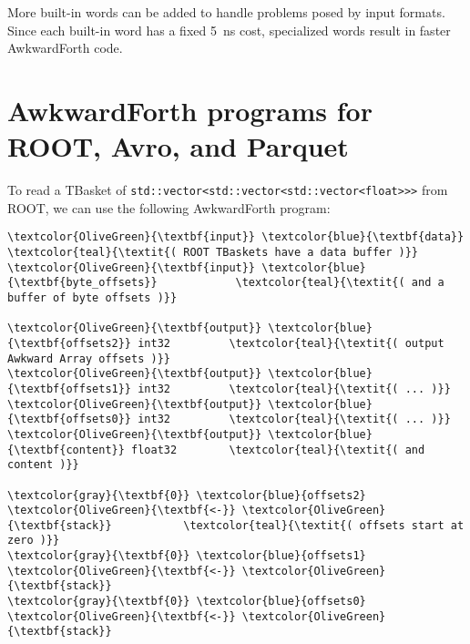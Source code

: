 \documentclass{webofc}
\begin{document}
More built-in words can be added to handle problems posed by input formats. Since each built-in word has a fixed 5~ns cost, specialized words result in faster AwkwardForth code.

\section{AwkwardForth programs for ROOT, Avro, and Parquet}

To read a TBasket of \texttt{std::vector<std::vector<std::vector<float>>>} from ROOT, we can use the following AwkwardForth program:

\begin{Verbatim}[commandchars=\\\{\}]
\textcolor{OliveGreen}{\textbf{input}} \textcolor{blue}{\textbf{data}}                    \textcolor{teal}{\textit{( ROOT TBaskets have a data buffer )}}
\textcolor{OliveGreen}{\textbf{input}} \textcolor{blue}{\textbf{byte_offsets}}            \textcolor{teal}{\textit{( and a buffer of byte offsets )}}

\textcolor{OliveGreen}{\textbf{output}} \textcolor{blue}{\textbf{offsets2}} int32         \textcolor{teal}{\textit{( output Awkward Array offsets )}}
\textcolor{OliveGreen}{\textbf{output}} \textcolor{blue}{\textbf{offsets1}} int32         \textcolor{teal}{\textit{( ... )}}
\textcolor{OliveGreen}{\textbf{output}} \textcolor{blue}{\textbf{offsets0}} int32         \textcolor{teal}{\textit{( ... )}}
\textcolor{OliveGreen}{\textbf{output}} \textcolor{blue}{\textbf{content}} float32        \textcolor{teal}{\textit{( and content )}}

\textcolor{gray}{\textbf{0}} \textcolor{blue}{offsets2} \textcolor{OliveGreen}{\textbf{<-}} \textcolor{OliveGreen}{\textbf{stack}}           \textcolor{teal}{\textit{( offsets start at zero )}}
\textcolor{gray}{\textbf{0}} \textcolor{blue}{offsets1} \textcolor{OliveGreen}{\textbf{<-}} \textcolor{OliveGreen}{\textbf{stack}}
\textcolor{gray}{\textbf{0}} \textcolor{blue}{offsets0} \textcolor{OliveGreen}{\textbf{<-}} \textcolor{OliveGreen}{\textbf{stack}}


\end{Verbatim}
\end{document}
